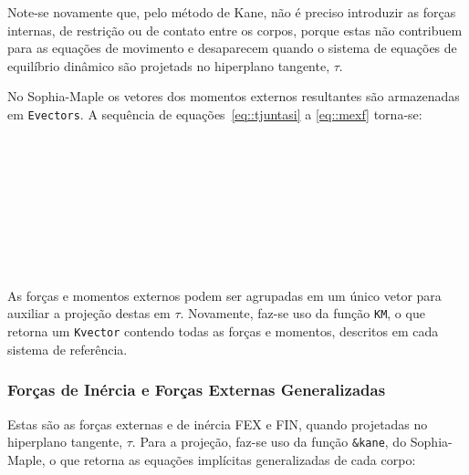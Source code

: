 Note-se novamente que, pelo método de Kane, não é preciso introduzir as forças
internas, de restrição ou de contato entre os corpos, porque estas não
contribuem para as equações de movimento e desaparecem quando o sistema de
equações de equilíbrio dinâmico são projetads no hiperplano tangente, $\tau$.

No Sophia-Maple os vetores dos momentos externos resultantes são armazenadas em
\texttt{Evectors}. A sequência de equações~\ref{eq::tjuntasi} a \ref{eq::mexf}
torna-se:

\bigskip {} \\
		  \\
		  \\
		  \\
		  \\

\medskip {} \\
		  \\
		  \bigskip

		 
As forças e momentos externos podem ser agrupadas em um único vetor para
auxiliar a projeção destas em $\tau$. Novamente, faz-se uso da função
\texttt{KM}, o que retorna um \texttt{Kvector} contendo todas as forças e
momentos, descritos em cada sistema de referência.

\bigskip {}

		 
\subsubsection{Forças de Inércia e  Forças Externas Generalizadas}

Estas são as forças externas e de inércia FEX e FIN, quando projetadas no
hiperplano tangente, $\tau$. Para a projeção, faz-se uso da função
\texttt{\&kane}, do Sophia-Maple, o que retorna as equações implícitas
generalizadas de cada corpo:

\bigskip {} \\
		 
